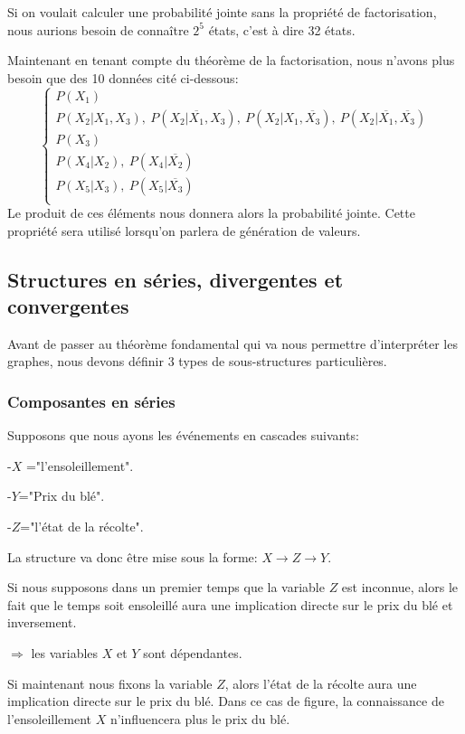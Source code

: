 \documentclass[a4paper]{article}
\begin{document}
Si on voulait calculer une  probabilité jointe sans la propriété de factorisation, nous aurions besoin de connaître $2^{5}$ états, c'est à dire 32 états.


 Maintenant en tenant compte du théorème de la factorisation, nous n'avons plus besoin que des 10 données cité ci-dessous:  
$$\left\lbrace 
\begin{array}{lcl} 
  P(X_  1)  \\ 
P(X_2|X_1,X_3),\  P(X_2|\overline{X_1},X_3)  ,\ P(X_2|X_1,\overline{X_3}) ,\  P(X_2|\overline{X_1},\overline{X_3})\\ 
P(X_3)    \\
P(X_4|X_2) ,\  P(X_4|\overline{X_2})\\
P(X_5|X_3) ,\ P(X_5|\overline{X_3})\\
\end{array}\right.$$
Le produit de ces éléments nous donnera alors  la probabilité jointe. Cette propriété sera utilisé lorsqu'on parlera de génération de valeurs.

\subsection{Structures en séries, divergentes et convergentes}

Avant de passer au théorème fondamental qui va nous permettre d'interpréter les graphes,
nous devons définir 3 types de sous-structures particulières.

\subsubsection{Composantes en séries}

Supposons que nous ayons les événements en cascades  suivants:

-$X$ ="l'ensoleillement".

-$Y$="Prix du blé".

-$Z$="l'état de la récolte".

La structure va donc être mise  sous la forme: $X\longrightarrow Z \longrightarrow Y$.

Si nous supposons dans un premier temps  que la variable $Z$ est inconnue,
alors le fait que le temps soit ensoleillé aura une implication directe  sur le prix du blé et inversement.

$\Longrightarrow$ les variables  $X$ et $Y$ sont dépendantes.

Si maintenant nous fixons la variable $Z$,
alors l'état de la  récolte  aura une implication directe sur le prix du blé.
Dans ce cas de figure,
la connaissance de l'ensoleillement $X$ n'influencera plus le prix du blé.  
\end{document}

